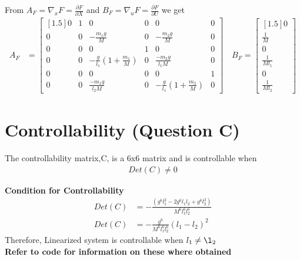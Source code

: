 \documentclass[12pt]{article}
\begin{document}
From $A_F = \nabla_xF=\frac{\partial F}{\partial X}$ and $B_F=\nabla_uF=\frac{\partial F}{\partial U}$ we get 
\begin{align}
  A_F&=
  \begin{bmatrix}[1.5]
   0 &1 &0 &0 &0 &0 \\
   0 &0 &-\frac{m_1g}{M} &0 &-\frac{m_2g}{M} &0 \\
   0 &0 &0 &1 &0 &0 \\
   0 &0 &-\frac{g}{l_1}(1+\frac{m_1}{M}) &0 &\frac{-m_2g}{l_1M} &0  \\
   0 &0 &0 &0 &0 &1 \\
   0 &0 &\frac{-m_1g}{l_2M} &0 &-\frac{g}{l_1}(1+\frac{m_2}{M}) &0 
  \end{bmatrix}
 \quad
  B_F =
  \begin{bmatrix}[1.5]
    0\\
    \frac{1}{M} \\
    0 \\
    \frac{1}{Ml_1}\\
    0 \\
    \frac{1}{Ml_2}
  \end{bmatrix}
\end{align}


\section{Controllability (Question C)}
The controllability matrix,C, is a 6x6 matrix and is controllable when
\begin{align}
  Det(C) \neq 0
\end{align}

\textbf{Condition for Controllability}
\begin{align}
  Det(C) &= -\frac{(g^6l_1^2-2g^6l_1l_2+g^6l_2^2)}{M^6l_1^6l_2^6} \\
  Det(C) &= -\frac{g^6}{M^6l_1^6l_2^6}(l_1-l_2)^2
\end{align}
Therefore, Linearized system is controllable when $l_1 \neq \l_2$ \\
\textbf{Refer to code for information on these where obtained}
\end{document}
